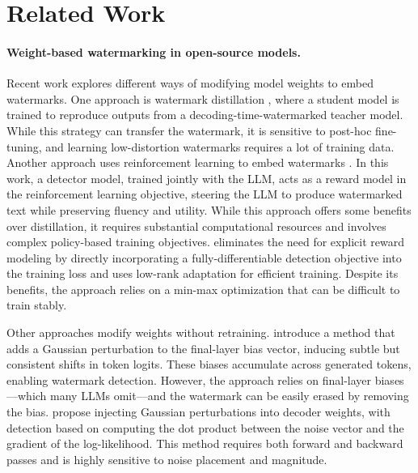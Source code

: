 \section{Related Work}
\label{sec:related_work}

\paragraph{Weight-based watermarking in open-source models.}

Recent work explores different ways of modifying model weights to embed watermarks. One approach is watermark distillation \citep{gu2023learnability}, where a student model is trained to reproduce outputs from a decoding-time-watermarked teacher model. While this strategy can transfer the watermark, it is sensitive to post-hoc fine-tuning, and learning low-distortion watermarks requires a lot of training data. Another approach uses reinforcement learning to embed watermarks \citep{xu2024learningwatermarkllmgeneratedtext}. In this work, a detector model, trained jointly with the LLM, acts as a reward model in the reinforcement learning objective, steering the LLM to produce watermarked text while preserving fluency and utility. While this approach offers some benefits over distillation, it requires substantial computational resources and involves complex policy-based training objectives. \citet{elhassan2025can} eliminates the need for explicit reward modeling by directly incorporating a fully-differentiable detection objective into the training loss and uses low-rank adaptation \citet{hu2022lora} for efficient training. Despite its benefits, the approach relies on a min-max optimization that can be difficult to train stably.

Other approaches modify weights without retraining. \citet{christ2024provably} introduce a method that adds a Gaussian perturbation to the final-layer bias vector, inducing subtle but consistent shifts in token logits. These biases accumulate across generated tokens, enabling watermark detection. However, the approach relies on final-layer biases—which many LLMs omit—and the watermark can be easily erased by removing the bias. \citet{block2025gaussmark} propose injecting Gaussian perturbations into decoder weights, with detection based on computing the dot product between the noise vector and the gradient of the log-likelihood. This method requires both forward and backward passes and is highly sensitive to noise placement and magnitude.